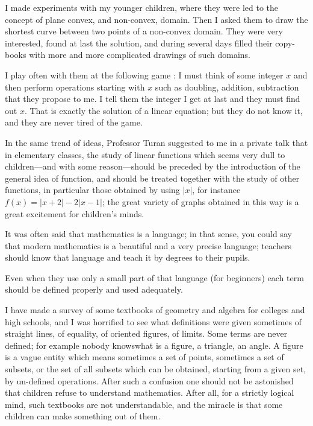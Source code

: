 I made experiments with my younger children, where they were led to the concept of plane convex, and non-convex, domain. Then I asked them to draw the shortest curve between two points of a non-convex domain. They were very interested, found at last the solution, and during several days filled their copy-books with more and more complicated drawings of such domains.

I play often with them at the following game : I must think of some integer $x$ and then perform operations starting with $x$ such as doubling, addition, subtraction that they propose to me. I tell them the integer I get at last and they must find out $x$. That is exactly the solution of a linear equation; but they do not know it, and they are never tired of the game.

In the same trend of ideas, Professor Turan suggested to me in a private talk that in elementary classes, the study of linear functions which seems very dull to children---and with some reason---should be preceded by the introduction of the general idea of function, and should be treated together with the study of other functions, in particular those obtained by using $|x|$, for instance $f(x)=|x+2|-2|x-1|$; the great variety of graphs obtained in this way is a great excitement for children's minds.

It was often said that mathematics is a language; in that sense, you could say that modern mathematics is a beautiful and a very precise language; teachers should know that language and teach it by degrees to their pupils.

Even when they use only a small part of that language (for beginners) each term should be defined properly and used adequately.

I have made a survey of some textbooks of geometry and algebra for colleges and high schools, and I was horrified to see what definitions were given sometimes of straight lines, of equality, of oriented figures, of limits. Some terms are never defined; for example nobody knows\pageoriginale what is a figure, a triangle, an angle. A figure is a vague entity which means sometimes a set of points, sometimes a set of subsets, or the set of all subsets which can be obtained, starting from a given set, by un-defined operations. After such a confusion one should not be astonished that children refuse to understand mathematics. After all, for a strictly logical mind, such textbooks are not understandable, and the miracle is that some children can make something out of them.

